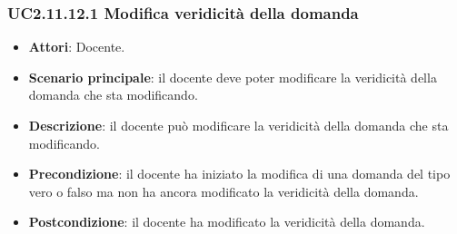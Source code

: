 \subsubsection{UC2.11.12.1 Modifica veridicità della domanda}
\begin{itemize}
\item \textbf{Attori}: Docente.
\item \textbf{Scenario principale}: il docente deve poter modificare la veridicità della domanda che sta modificando.
\item \textbf{Descrizione}: il docente può modificare la veridicità della domanda che sta modificando.
\item \textbf{Precondizione}: il docente ha iniziato la modifica di una domanda del tipo vero o falso ma non ha ancora modificato la veridicità della domanda.
\item \textbf{Postcondizione}: il docente ha modificato la veridicità della domanda.
\end{itemize}
